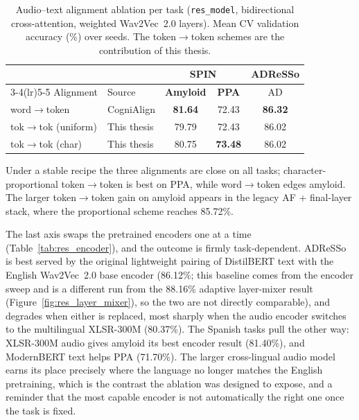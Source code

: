 \begin{table}[htbp]
\centering
\caption[Audio--text alignment ablation per task]{Audio--text alignment ablation per task (\texttt{res\_model}, bidirectional cross-attention, weighted Wav2Vec~2.0 layers). Mean CV validation accuracy (\%) over seeds. The token$\rightarrow$token schemes are the contribution of this thesis.}
\label{tab:res_alignment}
\small
\begin{tabular}{llccc}
\toprule
 & & \multicolumn{2}{c}{\textbf{SPIN}} & \textbf{ADReSSo} \\
\cmidrule(lr){3-4}\cmidrule(lr){5-5}
Alignment & Source & \textbf{Amyloid} & \textbf{PPA} & AD \\
\midrule
word$\rightarrow$token        & CogniAlign  & \textbf{81.64} & 72.43 & \textbf{86.32} \\
tok$\rightarrow$tok (uniform) & This thesis & 79.79 & 72.43 & 86.02 \\
tok$\rightarrow$tok (char)    & This thesis & 80.75 & \textbf{73.48} & 86.02 \\
\bottomrule
\end{tabular}

\vspace{2pt}
{\footnotesize Under a stable recipe the three alignments are close on all tasks; character-proportional token$\rightarrow$token is best on PPA, while word$\rightarrow$token edges amyloid. The larger token$\rightarrow$token gain on amyloid appears in the legacy AF + final-layer stack, where the proportional scheme reaches 85.72\%.}
\end{table}

The last axis swaps the pretrained encoders one at a time (Table~\ref{tab:res_encoder}), and the outcome is firmly task-dependent. ADReSSo is best served by the original lightweight pairing of DistilBERT text with the English Wav2Vec~2.0 base encoder (86.12\%; this baseline comes from the encoder sweep and is a different run from the 88.16\% adaptive layer-mixer result (Figure~\ref{fig:res_layer_mixer}), so the two are not directly comparable), and degrades when either is replaced, most sharply when the audio encoder switches to the multilingual XLSR-300M (80.37\%). The Spanish tasks pull the other way: XLSR-300M audio gives amyloid its best encoder result (81.40\%), and ModernBERT text helps PPA (71.70\%). The larger cross-lingual audio model earns its place precisely where the language no longer matches the English pretraining, which is the contrast the ablation was designed to expose, and a reminder that the most capable encoder is not automatically the right one once the task is fixed.

